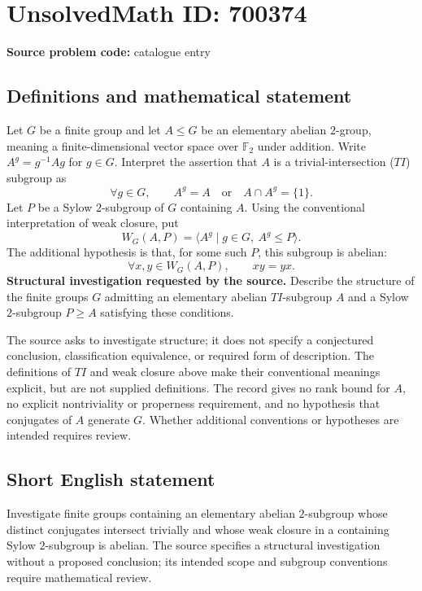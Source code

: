 \documentclass[11pt]{article}
\newcommand{\F}{\mathbb{F}}
\begin{document}
\section*{UnsolvedMath ID: 700374}
\textbf{Source problem code:} catalogue entry
\subsection{Definitions and mathematical statement}
Let \(G\) be a finite group and let \(A\leq G\) be an elementary abelian \(2\)-group, meaning a finite-dimensional vector space over \(\F_2\) under addition. Write \(A^g=g^{-1}Ag\) for \(g\in G\). Interpret the assertion that \(A\) is a trivial-intersection (\(TI\)) subgroup as
\[
\forall g\in G,\qquad A^g=A\quad\text{or}\quad A\cap A^g=\{1\}.
\]
Let \(P\) be a Sylow \(2\)-subgroup of \(G\) containing \(A\). Using the conventional interpretation of weak closure, put
\[
W_G(A,P)=\bigl\langle A^g\mid g\in G,\ A^g\leq P\bigr\rangle.
\]
The additional hypothesis is that, for some such \(P\), this subgroup is abelian:
\[
\forall x,y\in W_G(A,P),\qquad xy=yx.
\]
\textbf{Structural investigation requested by the source.} Describe the structure of the finite groups \(G\) admitting an elementary abelian \(TI\)-subgroup \(A\) and a Sylow \(2\)-subgroup \(P\geq A\) satisfying these conditions.

The source asks to investigate structure; it does not specify a conjectured conclusion, classification equivalence, or required form of description. The definitions of \(TI\) and weak closure above make their conventional meanings explicit, but are not supplied definitions. The record gives no rank bound for \(A\), no explicit nontriviality or properness requirement, and no hypothesis that conjugates of \(A\) generate \(G\). Whether additional conventions or hypotheses are intended requires review.
\subsection{Short English statement}
Investigate finite groups containing an elementary abelian \(2\)-subgroup whose distinct conjugates intersect trivially and whose weak closure in a containing Sylow \(2\)-subgroup is abelian. The source specifies a structural investigation without a proposed conclusion; its intended scope and subgroup conventions require mathematical review.
\end{document}
